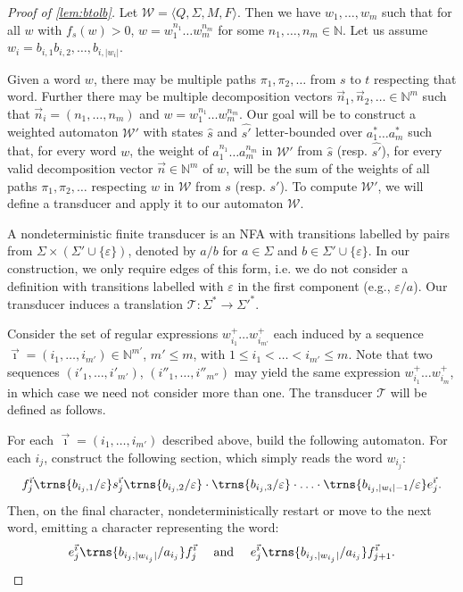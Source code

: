 \documentclass{lmcs}
\theoremstyle{plain}
\theoremstyle{definition}
\theoremstyle{remark}
\newcommand\abra[1]{\langle #1 \rangle}
\newcommand\wa{\mathcal{W}}
\renewcommand\nu{f}
\begin{document}
\begin{proof}[Proof of \cref{lem:btolb}]
Let $\wa = \abra{Q,\Sigma,M,F}$. Then we have $w_1,\dots,w_m$ such that for all $w$  with $\nu_s(w) > 0$, $w = w_1^{n_1}\dots w_m^{n_m}$ for some $n_1,\dots,n_m\in \mathbb{N}$. Let us assume $w_i = b_{i,1}b_{i,2},\dots,b_{i,|w_i|}$.

Given a word $w$, there may be multiple paths $\pi_1,\pi_2,\dots$ from $s$ to $t$ respecting that word. Further there may be multiple decomposition vectors $\vec{n}_1,\vec{n}_2,\dots \in \mathbb{N}^m$ such that $\vec{n}_i = (n_1,\dots,n_m)$ and  $w = w_1^{n_1}\dots w_m^{n_m}$. Our goal will be to construct a weighted automaton $\wa'$ with states $\hat{s}$ and $\hat{s'}$ letter-bounded over $a_1^*\dots a_m^*$ such that, for every word $w$,
the weight of $a_1^{n_1}\dots a_m^{n_m}$ in $\wa'$ from $\hat{s}$ (resp. $\hat{s'}$), for every valid decomposition vector $\vec{n} \in \mathbb{N}^m$ of $w$,
will be the sum of the weights of all paths $\pi_1,\pi_2,\dots$ respecting $w$ in $\wa$  from $s$ (resp. $s'$).
To compute $\wa'$, we will define a transducer and apply it to our automaton $\wa$.

A nondeterministic finite transducer is an NFA with transitions labelled by pairs from  $\Sigma \times (\Sigma' \cup \{\varepsilon\})$, denoted by $a/b$  for $a\in\Sigma$ and $b\in\Sigma' \cup \{\varepsilon\}$. In our construction, we only require edges of this form,
i.e. we do not consider a definition with transitions labelled with $\varepsilon $ in the first component (e.g., $\varepsilon/a$).  Our transducer induces a translation $\mathcal{T}: \Sigma^* \to \Sigma'^*$.

Consider the set of regular expressions $w_{i_1}^+\dots w_{i_{m'}}^+$ each induced by a sequence $\vec{\imath}=(i_1,\dots,i_{m'}) \in \mathbb{N}^{m'}$,  $m' \le m $, with $1  \le i_1 < \dots < i_{m'} \le m$. Note that two sequences $(i'_1,\dots,i'_{m'})$, $(i''_1,\dots,i''_{m''})$ may yield the same expression $w_{i_1}^+\dots w_{i_m}^+$, in which case we need not consider more than one. The transducer $\mathcal{T}$ will be defined as follows.

For each $\vec{\imath} = (i_1,\dots,i_{m'})$  described above, build the following automaton. For each $i_j$, construct the following section, which simply reads the word $w_{i_j}$:
\[ f^{\vec{\imath}}_j\trns{b_{i_j,1}/\varepsilon} s^{\vec{\imath}}_j\trns{b_{i_j,2 }/\varepsilon} \cdot \trns{b_{i_j,3 }/\varepsilon} \cdot  \ldots \cdot \trns{b_{i_j,|w_i| -1}/\varepsilon} e^{\vec{\imath}}_j.\]
Then, on the final character, nondeterministically restart or move to the next word, emitting a character representing the word:
\[e^{\vec{\imath}}_j \trns{b_{i_j, |w_{i_j}|}/a_{i_j}} f^{\vec{\imath}}_j \quad \text{ and }\quad  e^{\vec{\imath}}_j \trns{b_{i_j, |w_{i_j}|}/a_{i_j}} f^{\vec{\imath}}_{j+1}.\]


\end{proof}
\end{document}
